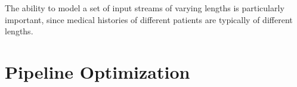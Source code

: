 \documentclass[onecolumn,,10pt]{IEEEtran}
\begin{document}
The ability to model a set of input streams of varying lengths is particularly important, since medical histories of different patients are typically of different lengths.




\section{Pipeline Optimization}\label{sec:pipeline}



%
%
\end{document}
